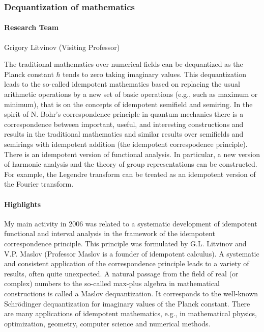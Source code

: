 \subsubsection{Dequantization of mathema\-tics}
\paragraph{Research Team}
Grigory Litvinov (Visiting Professor)

\medskip


  The traditional mathematics over numerical fields can be
dequantized as the Planck constant $\hbar$ tends to zero taking
imaginary values.  This dequantization leads to the so-called
idempotent mathematics based on replacing the usual arithmetic
operations by a new set of basic operations (e.g., such as maximum
or minimum), that is on the concepts of idempotent semifield and
semiring. In the spirit of N. Bohr's correspondence principle in
quantum mechanics there is a correspondence between important,
useful, and interesting constructions and results in the
traditional mathematics and similar results over semifields and
semirings with idempotent addition (the idempotent correspodence
principle). There is an idempotent version
of functional analysis. In particular, a new version of harmonic
analysis and the theory of group representations can be
constructed. For example, the Legendre transform can be treated as
an idempotent version of the Fourier transform.

\paragraph{Highlights}


My main activity in 2006 was related to a systematic development
of idempotent functional and interval analysis in the framework of
the idempotent correspondence principle. This
principle was formulated by G.L. Litvinov and V.P.
Maslov (Professor Maslov is a founder of idempotent calculus).
A systematic and consistent
application of the correspondence principle leads to a variety of
results, often quite unexpected. A natural passage from the field
of real (or complex) numbers to the so-called max-plus algebra in
mathematical constructions is called a Maslov dequantization. It
corresponds to the well-known Schr\"odinger dequantization for
imaginary values of the Planck constant. There are many
applications of idempotent mathematics, e.g., in mathematical
physics, optimization, geometry, computer science and numerical
methods.

